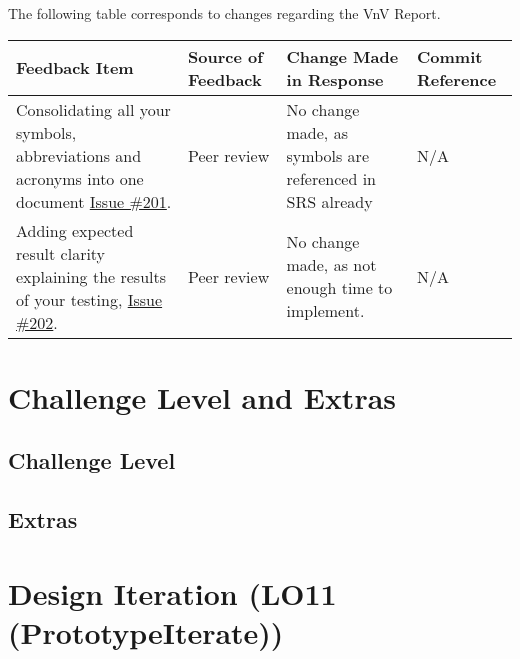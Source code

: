 \documentclass{article}
\begin{document}
The following table corresponds to changes regarding the VnV Report.
\begin{longtable}{|p{4cm}|p{1.5cm}|p{4cm}|p{1.5cm}|}
    \hline
    \textbf{Feedback Item} & \textbf{Source of Feedback} & \textbf{Change Made in Response} & \textbf{Commit Reference} \\
    \hline
    \endfirsthead
    \hline
    \endhead
    \hline
    \endfoot
    \hline
    \endlastfoot
    Consolidating all your symbols, abbreviations and acronyms into one document \href{https://github.com/gr812b/CVT-Simulator/issues/201}{Issue \#201}. & Peer review  & No change made, as symbols are referenced in SRS already & N/A \\
    \hline
    Adding expected result clarity explaining the results of your testing, \href{https://github.com/gr812b/CVT-Simulator/issues/202}{Issue \#202}. & Peer review  & No change made, as not enough time to implement. & N/A \\
    
    \hline 
\end{longtable}    
\section{Challenge Level and Extras}

\subsection{Challenge Level}


\subsection{Extras}


\section{Design Iteration (LO11 (PrototypeIterate))}
\end{document}
